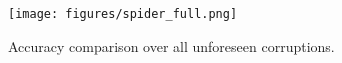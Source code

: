 \begin{figure}[h]
 \centering
  \texttt{[image: figures/spider\_full.png]}
  \caption{Accuracy comparison over all unforeseen corruptions.}
  \label{corruption}
\end{figure}






